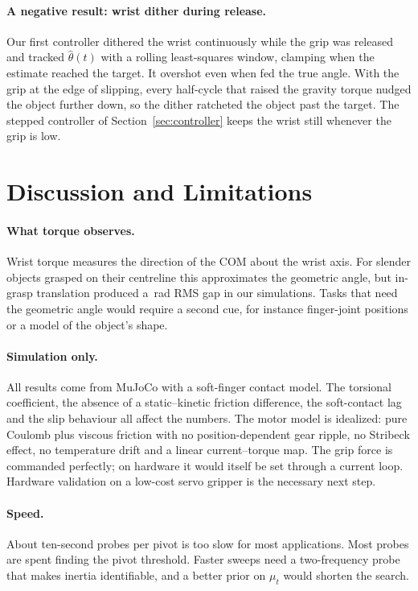 \documentclass[11pt]{article}
\begin{document}
\paragraph{A negative result: wrist dither during release.} Our first controller dithered the wrist continuously while the grip was released and tracked $\hat\theta(t)$ with a rolling least-squares window, clamping when the estimate reached the target. It overshot even when fed the true angle. With the grip at the edge of slipping, every half-cycle that raised the gravity torque nudged the object further down, so the dither ratcheted the object past the target. The stepped controller of Section~\ref{sec:controller} keeps the wrist still whenever the grip is low.

\section{Discussion and Limitations}
\paragraph{What torque observes.} Wrist torque measures the direction of the COM about the wrist axis. For slender objects grasped on their centreline this approximates the geometric angle, but in-grasp translation produced a \Agap{}\,rad RMS gap in our simulations. Tasks that need the geometric angle would require a second cue, for instance finger-joint positions or a model of the object's shape.

\paragraph{Simulation only.} All results come from MuJoCo with a soft-finger contact model. The torsional coefficient, the absence of a static--kinetic friction difference, the soft-contact lag and the slip behaviour all affect the numbers. The motor model is idealized: pure Coulomb plus viscous friction with no position-dependent gear ripple, no Stribeck effect, no temperature drift and a linear current--torque map. The grip force is commanded perfectly; on hardware it would itself be set through a current loop. Hardware validation on a low-cost servo gripper is the necessary next step.

\paragraph{Speed.} About \CCcProbes{} ten-second probes per pivot is too slow for most applications. Most probes are spent finding the pivot threshold. Faster sweeps need a two-frequency probe that makes inertia identifiable, and a better prior on $\mu_t$ would shorten the search.
\end{document}
